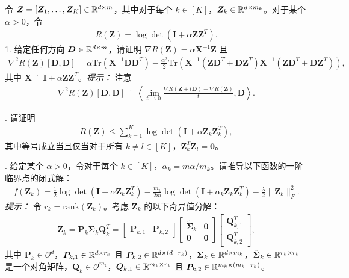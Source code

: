 \documentclass[../../book-main.tex]{subfiles}
\begin{document}
\begin{exercise}
    令 $\bm Z = [\bm Z_1,\dots,\bm Z_K] \in \mathbb{R}^{d\times m}$，其中对于每个 $k \in [K]$，$\bm Z_k \in \mathbb{R}^{d\times m_k}$。对于某个 $\alpha > 0$，令
    \begin{align*}
        R(\bm Z) = \log\det\left(\bm I + \alpha\bm Z\bm Z^T \right).
    \end{align*}
1. 给定任何方向 $\bm D \in \mathbb{R}^{d\times m}$，请证明 $\nabla R(\bm Z) = \alpha\bm X^{-1}\bm Z$ 且
    \begin{align*}
 \nabla^2 R(\bm Z)[\bm D, \bm D] =\alpha \mathrm{Tr}\left( \bm X^{-1}\bm D\bm D^T\right) - \frac{\alpha^2}{2}\mathrm{Tr}\left(\bm X^{-1}\left( \bm Z\bm D^T+\bm D\bm Z^T\right) \bm X^{-1}\left( \bm Z\bm D^T+\bm D\bm Z^T\right)\right),
    \end{align*}
    其中 $\bm X \doteq \bm I + \alpha\bm Z\bm Z^T$。{\em 提示：} 注意
    \begin{align*}
        \nabla^2 R(\bm Z)[\bm D, \bm D] \doteq \left\langle \lim_{t \to 0} \frac{\nabla R(\bm Z+ t\bm D) - \nabla R(\bm Z)}{t}, \bm D \right\rangle.
    \end{align*}

. 请证明
\begin{align*}
    R(\bm Z) \le \sum_{k=1}^K \log\det\left(\bm I + \alpha\bm Z_k\bm Z_k^T \right),
\end{align*}
其中等号成立当且仅当对于所有 $k \neq l \in [K]$，$\bm Z_k^T\bm Z_l = \bm 0$。
\medskip

. 给定某个 $\alpha >0$，令对于每个 $k \in [K]$，$\alpha_k=m\alpha/m_k$。请推导以下函数的一阶临界点的闭式解：
\begin{align*}
    f(\bm Z_k) = \frac{1}{2}\log\det\left(\bm I + \alpha\bm Z_k\bm Z_k^T \right) - \frac{m_k}{2m}\log\det\left(\bm I + \alpha_k \bm Z_k\bm Z_k^T \right) - \frac{\lambda}{2}\|\bm Z_k\|_F^2.
\end{align*}
{\em 提示：} 令 $r_k=\mathrm{rank}(\bm Z_k)$。考虑 $\bm Z_k$ 的以下奇异值分解：
\begin{align*}
    \bm Z_k = \bm P_k\bm \Sigma_k\bm Q_k^T = \begin{bmatrix}
        \bm P_{k,1} & \bm P_{k,2}
    \end{bmatrix} \begin{bmatrix}
        \tilde{\bm \Sigma}_{k} & \bm 0 \\
        \bm 0 & \bm 0
    \end{bmatrix}
    \begin{bmatrix}
        \bm Q_{k,1}^T \\ \bm Q_{k,2}^T
    \end{bmatrix},
\end{align*}
其中 $\bm P_k \in \mathcal{O}^d$，$\bm P_{k,1} \in \mathbb{R}^{d\times r_k}$ 且 $\bm P_{k,2} \in \mathbb{R}^{d\times (d-r_k)}$，$\bm \Sigma_k \in \mathbb{R}^{d\times m_k}$，$\tilde{\bm \Sigma}_{k} \in \mathbb{R}^{r_k\times r_k}$ 是一个对角矩阵，$\bm Q_k \in \mathcal{O}^{m_k}$，$\bm Q_{k,1} \in \mathbb{R}^{m_k\times r_k}$ 且 $\bm P_{k,2} \in \mathbb{R}^{m_k \times (m_k-r_k)}$。
\medskip

\end{exercise}
\end{document}
